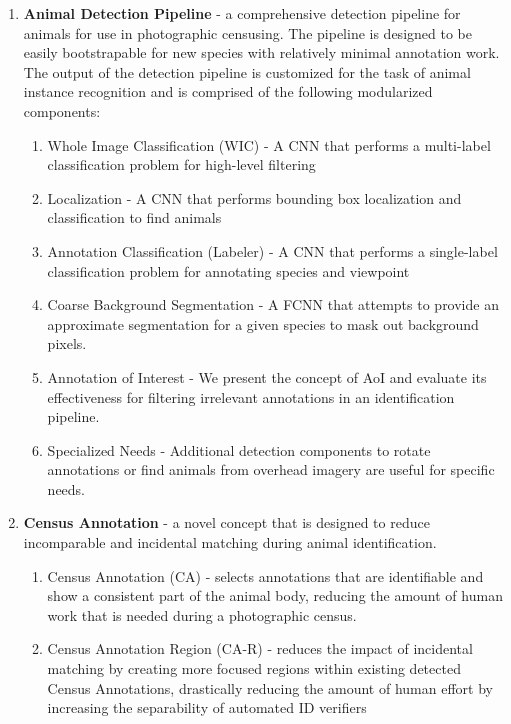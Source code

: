 \begin{enumerate}
    \item \textbf{Animal Detection Pipeline} - a comprehensive detection pipeline for animals for use in photographic censusing.  The pipeline is designed to be easily bootstrapable for new species with relatively minimal annotation work.  The output of the detection pipeline is customized for the task of animal instance recognition and is comprised of the following modularized components:
          \begin{enumerate}
              \item Whole Image Classification (WIC) - A CNN that performs a multi-label classification problem for high-level filtering
              \item Localization - A CNN that performs bounding box localization and classification to find animals
              \item Annotation Classification (Labeler) - A CNN that performs a single-label classification problem for annotating species and viewpoint
              \item Coarse Background Segmentation - A FCNN that attempts to provide an approximate segmentation for a given species to mask out background pixels.
              \item Annotation of Interest - We present the concept of AoI and evaluate its effectiveness for filtering irrelevant annotations in an identification pipeline.
              \item Specialized Needs - Additional detection components to rotate annotations or find animals from overhead imagery are useful for specific needs.
          \end{enumerate}
    \item \textbf{Census Annotation} - a novel concept that is designed to reduce incomparable and incidental matching during animal identification.
          \begin{enumerate}
              \item Census Annotation (CA) - selects annotations that are identifiable and show a consistent part of the animal body, reducing the amount of human work that is needed during a photographic census.
              \item Census Annotation Region (CA-R) - reduces the impact of incidental matching by creating more focused regions within existing detected Census Annotations, drastically reducing the amount of human effort by increasing the separability of automated ID verifiers

\end{enumerate}
\end{enumerate}
